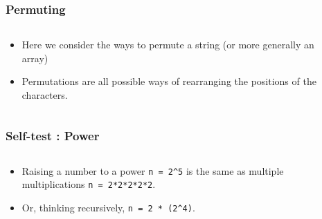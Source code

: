 \begin{frame}[fragile]
\frametitle{Permuting}
\begin{columns}[T]

\begin{column}{0.40\textwidth}
\begin{itemize}[<+->]
\item Here we consider the ways to permute a string (or more generally an array)
\item Permutations are all possible ways of rearranging the positions of the characters.

\end{itemize}
\end{column}

\pause
\begin{column}{0.50\textwidth}

\end{column}

\end{columns}
\end{frame}


\begin{frame}[fragile]
\frametitle{Self-test : Power}
\begin{columns}[T]

\begin{column}{0.45\textwidth}
\begin{itemize}[<+->]
\item Raising a number to a power \verb$n = 2^5$ is the same
as multiple multiplications \verb^n = 2*2*2*2*2^.
\item Or, thinking recursively, \verb$n = 2 * (2^4)$.
\end{itemize}
\end{column}

\pause
\begin{column}{0.45\textwidth}

\end{column}

\end{columns}
\end{frame}
